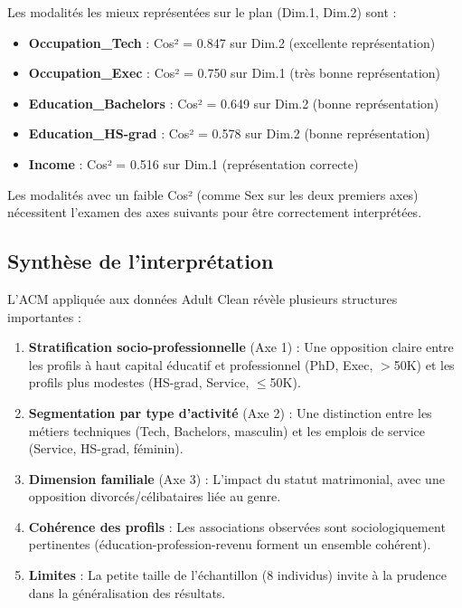 \documentclass[12pt,a4paper]{article}
\begin{document}
Les modalités les mieux représentées sur le plan (Dim.1, Dim.2) sont :
\begin{itemize}
    \item \textbf{Occupation\_Tech} : Cos² = 0.847 sur Dim.2 (excellente représentation)
    \item \textbf{Occupation\_Exec} : Cos² = 0.750 sur Dim.1 (très bonne représentation)
    \item \textbf{Education\_Bachelors} : Cos² = 0.649 sur Dim.2 (bonne représentation)
    \item \textbf{Education\_HS-grad} : Cos² = 0.578 sur Dim.2 (bonne représentation)
    \item \textbf{Income} : Cos² = 0.516 sur Dim.1 (représentation correcte)
\end{itemize}

Les modalités avec un faible Cos² (comme Sex sur les deux premiers axes) nécessitent l'examen des axes suivants pour être correctement interprétées.

\subsection{Synthèse de l'interprétation}

L'ACM appliquée aux données Adult Clean révèle plusieurs structures importantes :

\begin{enumerate}
    \item \textbf{Stratification socio-professionnelle} (Axe 1) : Une opposition claire entre les profils à haut capital éducatif et professionnel (PhD, Exec, $>$50K) et les profils plus modestes (HS-grad, Service, $\leq$50K).
    
    \item \textbf{Segmentation par type d'activité} (Axe 2) : Une distinction entre les métiers techniques (Tech, Bachelors, masculin) et les emplois de service (Service, HS-grad, féminin).
    
    \item \textbf{Dimension familiale} (Axe 3) : L'impact du statut matrimonial, avec une opposition divorcés/célibataires liée au genre.
    
    \item \textbf{Cohérence des profils} : Les associations observées sont sociologiquement pertinentes (éducation-profession-revenu forment un ensemble cohérent).
    
    \item \textbf{Limites} : La petite taille de l'échantillon (8 individus) invite à la prudence dans la généralisation des résultats.
\end{enumerate}
\end{document}
